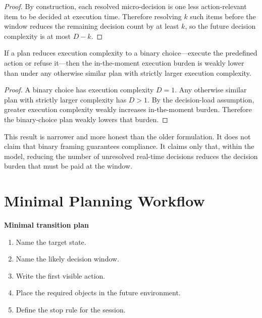 \begin{proof}
By construction, each resolved micro-decision is one less action-relevant item
to be decided at execution time. Therefore resolving $k$ such items before the
window reduces the remaining decision count by at least $k$, so the future
decision complexity is at most $D-k$.
\end{proof}

\begin{corollary}
If a plan reduces execution complexity to a binary choice---execute the
predefined action or refuse it---then the in-the-moment execution burden is
weakly lower than under any otherwise similar plan with strictly larger
execution complexity.
\end{corollary}

\begin{proof}
A binary choice has execution complexity $D=1$. Any otherwise similar plan with
strictly larger complexity has $D>1$. By the decision-load assumption, greater
execution complexity weakly increases in-the-moment burden. Therefore the
binary-choice plan weakly lowers that burden.
\end{proof}

\begin{discussion}
This result is narrower and more honest than the older formulation. It does not
claim that binary framing guarantees compliance. It claims only that, within
the model, reducing the number of unresolved real-time decisions reduces the
decision burden that must be paid at the window.
\end{discussion}

\section{Minimal Planning Workflow}

\begin{templatebox}
\textbf{Minimal transition plan}
\begin{enumerate}[nosep]
  \item Name the target state.
  \item Name the likely decision window.
  \item Write the first visible action.
  \item Place the required objects in the future environment.
  \item Define the stop rule for the session.
\end{enumerate}
\end{templatebox}

